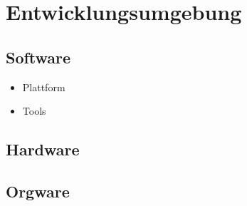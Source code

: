 \section{Entwicklungsumgebung}


\subsection{Software}

\begin{itemize}
  \item Plattform
    \begin{itemize}

    \end{itemize}
  \item Tools
    \begin{itemize}
  
    \end{itemize}

\end{itemize}

\subsection{Hardware}

\begin{itemize}

\end{itemize}

\subsection{Orgware}

\begin{itemize}
  
\end{itemize}
